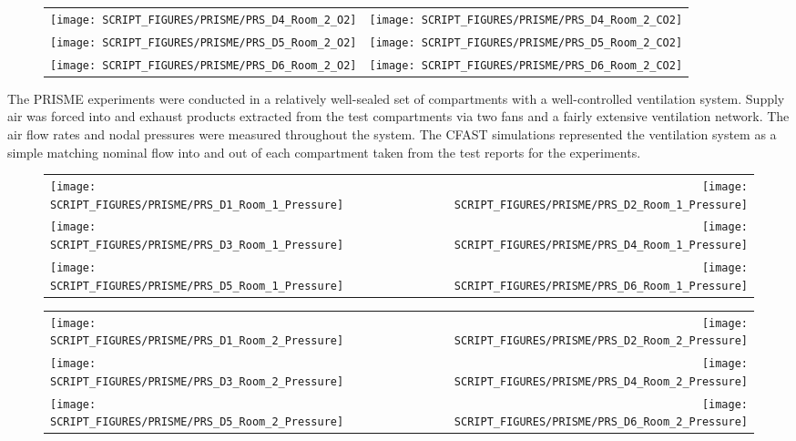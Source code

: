 \begin{figure}[p]
\begin{tabular*}{\textwidth}{l@{\extracolsep{\fill}}r}
\texttt{[image: SCRIPT\_FIGURES/PRISME/PRS\_D4\_Room\_2\_O2]} &
\texttt{[image: SCRIPT\_FIGURES/PRISME/PRS\_D4\_Room\_2\_CO2]} \\
\texttt{[image: SCRIPT\_FIGURES/PRISME/PRS\_D5\_Room\_2\_O2]} &
\texttt{[image: SCRIPT\_FIGURES/PRISME/PRS\_D5\_Room\_2\_CO2]} \\
\texttt{[image: SCRIPT\_FIGURES/PRISME/PRS\_D6\_Room\_2\_O2]} &
\texttt{[image: SCRIPT\_FIGURES/PRISME/PRS\_D6\_Room\_2\_CO2]}
\end{tabular*}
\label{PRISME_Gas_4}
\end{figure}

\clearpage

The PRISME experiments were conducted in a relatively well-sealed set of compartments with a well-controlled ventilation system. Supply air was forced into and exhaust products extracted from the test compartments via two fans and a fairly extensive ventilation network. The air flow rates and nodal pressures were measured throughout the system. The CFAST simulations represented the ventilation system as a simple matching nominal flow into and out of each compartment taken from the test reports for the experiments.

\begin{figure}[!ht]
\begin{tabular*}{\textwidth}{l@{\extracolsep{\fill}}r}
\texttt{[image: SCRIPT\_FIGURES/PRISME/PRS\_D1\_Room\_1\_Pressure]} &
\texttt{[image: SCRIPT\_FIGURES/PRISME/PRS\_D2\_Room\_1\_Pressure]} \\
\texttt{[image: SCRIPT\_FIGURES/PRISME/PRS\_D3\_Room\_1\_Pressure]} &
\texttt{[image: SCRIPT\_FIGURES/PRISME/PRS\_D4\_Room\_1\_Pressure]} \\
\texttt{[image: SCRIPT\_FIGURES/PRISME/PRS\_D5\_Room\_1\_Pressure]} &
\texttt{[image: SCRIPT\_FIGURES/PRISME/PRS\_D6\_Room\_1\_Pressure]}
\end{tabular*}
\label{PRISME_Room_1_Pressures}
\end{figure}

\begin{figure}[p]
\begin{tabular*}{\textwidth}{l@{\extracolsep{\fill}}r}
\texttt{[image: SCRIPT\_FIGURES/PRISME/PRS\_D1\_Room\_2\_Pressure]} &
\texttt{[image: SCRIPT\_FIGURES/PRISME/PRS\_D2\_Room\_2\_Pressure]} \\
\texttt{[image: SCRIPT\_FIGURES/PRISME/PRS\_D3\_Room\_2\_Pressure]} &
\texttt{[image: SCRIPT\_FIGURES/PRISME/PRS\_D4\_Room\_2\_Pressure]} \\
\texttt{[image: SCRIPT\_FIGURES/PRISME/PRS\_D5\_Room\_2\_Pressure]} &
\texttt{[image: SCRIPT\_FIGURES/PRISME/PRS\_D6\_Room\_2\_Pressure]}
\end{tabular*}
\label{PRISME_Room_2_Pressures}
\end{figure}

